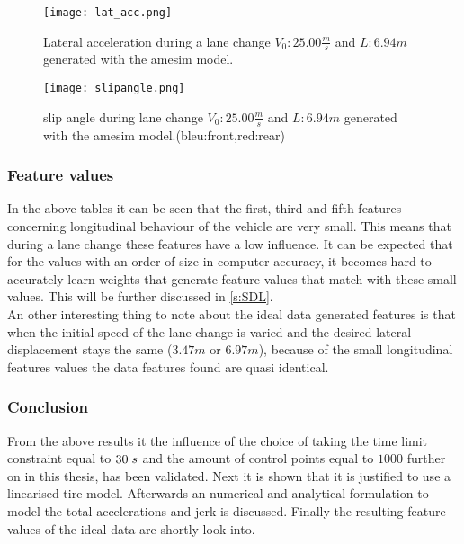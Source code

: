  \begin{figure}[h!]
	\centering
	\texttt{[image: lat\_acc.png]}
	\caption{Lateral acceleration during a lane change $V_0: 25.00 \frac{m}{s}$ and $L:6.94 m$ generated with the amesim model.}
	\label{fig:lat_acc_val}
\end{figure}

 \begin{figure}[h!]
	\centering
	\texttt{[image: slipangle.png]}
	\caption{slip angle during lane change $V_0: 25.00 \frac{m}{s}$ and $L:6.94 m$ generated with the amesim model.(bleu:front,red:rear)}
	\label{fig:slip angle_val}
\end{figure}


\subsubsection{Feature values} \label{s:fv_val}
In the above tables it can be seen that the first, third and fifth features concerning longitudinal behaviour of the vehicle are very small. This means that during a lane change these features have a low influence. It can be expected that for the values with an order of size in computer accuracy, it becomes hard to accurately learn weights that generate feature values that match with these small values. This will be further discussed in \ref{s:SDL}.\\%

An other interesting thing to note about the ideal data generated features is that when the initial speed of the lane change is varied and the desired lateral displacement stays the same ($3.47m$ or $6.97m$), because of the small longitudinal features values the data features found are quasi identical. 

\subsubsection{Conclusion}
From the above results it the influence of the choice of taking the time limit constraint equal to $30 \hspace{1mm}s$ and the amount of control points equal to $1000$ further on in this thesis, has been validated. Next it is shown that it is justified to use a linearised tire model. Afterwards an numerical and analytical formulation to model the total accelerations and jerk is discussed. Finally the resulting feature values of the ideal data are shortly look into. 

